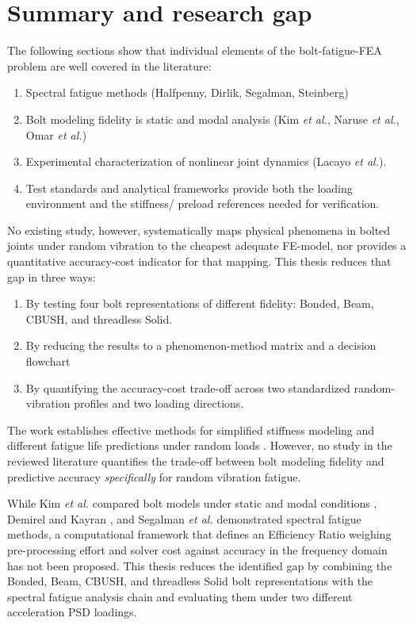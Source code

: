 \documentclass[a4paper,twoside]{bth}
\begin{document}
\section{Summary and research gap}
\label{sec:summary}

The following sections show that individual elements of the bolt-fatigue-FEA problem are well covered in the literature:
\begin{enumerate}
    \item Spectral fatigue methods (Halfpenny, Dirlik, Segalman, Steinberg)
    \item Bolt modeling fidelity is static and modal analysis (Kim \textit{et al.}, Naruse \textit{et al.}, Omar \textit{et al.})
    \item Experimental characterization of nonlinear joint dynamics (Lacayo \textit{et al.}).
    \item Test standards and analytical frameworks provide both the loading environment and the stiffness/ preload references needed for verification.
\end{enumerate}

No existing study, however, systematically maps physical phenomena in bolted joints under random vibration to the cheapest adequate FE-model, nor provides a quantitative accuracy-cost indicator for that mapping. This thesis reduces that gap in three ways:
\begin{enumerate}
    \item By testing four bolt representations of different fidelity: Bonded, Beam, CBUSH, and threadless Solid.
    \item By reducing the results to a phenomenon-method matrix and a decision flowchart
    \item By quantifying the accuracy-cost trade-off across two standardized random-vibration profiles and two loading directions.
\end{enumerate}

The work establishes effective methods for simplified stiffness modeling \cite{07} and different fatigue life predictions under random loads \cite{03, 10, segalman_efficient_2000, 72}. However, no study in the reviewed literature quantifies the trade-off between bolt modeling fidelity and predictive accuracy \textit{specifically} for random vibration fatigue.

While Kim \textit{et al.} compared bolt models under static and modal conditions \cite{27}, Demirel and Kayran \cite{72}, and Segalman \textit{et al.} \cite{segalman_efficient_2000} demonstrated spectral fatigue methods, a computational framework that defines an Efficiency Ratio weighing pre-processing effort and solver cost against accuracy in the frequency domain has not been proposed. This thesis reduces the identified gap by combining the Bonded, Beam, CBUSH, and threadless Solid bolt representations with the spectral fatigue analysis chain and evaluating them under two different acceleration \ac{PSD} loadings.
\end{document}
